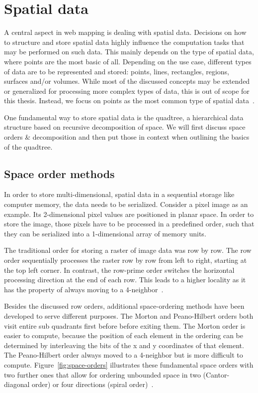 
%
%

\section{Spatial data}

A central aspect in web mapping is dealing with spatial data. Decisions on how to structure and store spatial data highly influence the computation tasks that may be performed on such data. This mainly depends on the type of spatial data, where points are the most basic of all. Depending on the use case, different types of data are to be represented and stored: points, lines, rectangles, regions, surfaces and/or volumes. While most of the discussed concepts may be extended or generalized for processing more complex types of data, this is out of scope for this thesis. Instead, we focus on points as the most common type of spatial data~\cite{Samet90spatialdata}.

One fundamental way to store spatial data is the quadtree, a hierarchical data structure based on recursive decomposition of space. We will first discuss space orders \& decomposition and then put those in context when outlining the basics of the quadtree.

\subsection{Space order methods}

In order to store multi-dimensional, spatial data in a sequential storage like computer memory, the data needs to be serialized. Consider a pixel image as an example. Its 2-dimensional pixel values are positioned in planar space. In order to store the image, those pixels have to be processed in a predefined order, such that they can be serialized into a 1-dimensional array of memory units.

The traditional order for storing a raster of image data was row by row. The row order sequentially processes the raster row by row from left to right, starting at the top left corner. In contrast, the row-prime order switches the horizontal processing direction at the end of each row. This leads to a higher locality as it has the property of always moving to a 4-neighbor~\cite{Goodchild83raster}.

Besides the discussed row orders, additional space-ordering methods have been developed to serve different purposes. The Morton and Peano-Hilbert orders both visit entire sub quadrants first before before exiting them. The Morton order is easier to compute, because the position of each element in the ordering can be determined by interleaving the bits of the x and y coordinates of that element. The Peano-Hilbert order always moved to a 4-neighbor but is more difficult to compute. Figure~\ref{fig:space-orders} illustrates these fundamental space orders with two further ones that allow for ordering unbounded space in two (Cantor-diagonal order) or four directions (spiral order)~\cite{Samet90spatialdata}.

